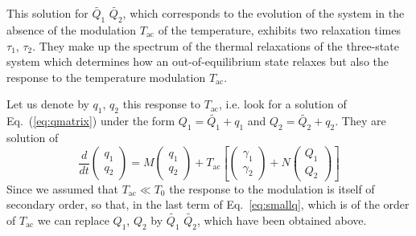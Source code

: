 \documentclass[pre,a4paper,twocolumn,superscriptaddress,%
floatfix]{revtex4}
\newcommand{\tac}{\ensuremath{T_{\mathrm{ac}}}}
\begin{document}
This solution for $\widetilde{Q_1}$ $\widetilde{Q_2}$, which corresponds to the
evolution of the system in the absence of the modulation $\tac$ of the
temperature, exhibits two relaxation times $\tau_1$, $\tau_2$. They
make up the spectrum of the thermal relaxations of the three-state system
which determines how an out-of-equilibrium state relaxes but also the response
to the temperature modulation $\tac$.

\medskip
Let us denote by $q_1$, $q_2$ this response to $\tac$, i.e. look for a
solution of Eq.~(\ref{eq:qmatrix}) under the form $Q_1 = \widetilde{Q_1} +
q_1$ and 
$Q_2 = \widetilde{Q_2} + q_2$. They are solution of
\begin{equation}
  \label{eq:smallq}
  \frac{d}{dt} \left( \begin{array}{c}q_1 \\ q_2 \end{array} \right)
  = M  \left( \begin{array}{c}q_1 \\ q_2 \end{array} \right)
  + \tac \left[ \left( \begin{array}{c}\gamma_1 \\ \gamma_2 \end{array} \right)
+ N \left( \begin{array}{c}Q_1 \\ Q_2 \end{array} \right) \right]
\end{equation}
Since we assumed that $\tac \ll T_0$ the response to the modulation
is itself of secondary order, so that, in the last term of
Eq.~\ref{eq:smallq}, which is of the order of $\tac$ we can replace
$Q_1$, $Q_2$ by $\widetilde{Q_1}$ $\widetilde{Q_2}$, which have been obtained
above. 
\end{document}
